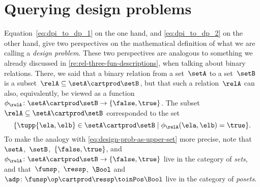 
\section{Querying design problems}
\label{sec:dp-querying}



Equation~\cref{eq:dpi_to_dp_1} on the one hand, and \cref{eq:dpi_to_dp_2} on the other hand, give two perspectives on the mathematical definition of what we are calling a \emph{design problem}.
These two perspectives are analogous to something we already discussed in \cref{re:rel-three-fun-descriptions}, when talking about binary relations.
There, we said that a binary relation from a set~$\setA$ to a set~$\setB$ is a subset~$\relA \subseteq \setA \cartprod \setB$,
but that such a relation~$\relA$ can also, equivalently, be viewed as a function~$\phi_{\relA}\colon \setA \cartprod\setB \to \{ \false, \true \}$.
The subset~$\relA \subseteq \setA \cartprod \setB$ corresponded to the set
\begin{equation}
	\{ \tupp{\ela, \elb} \in \setA \cartprod \setB \mid \phi_{\relA}(\ela, \elb) = \true \}.
\end{equation}
%
To make the analogy with \cref{eq:design-prob-as-upper-set} more precise, note that~$\setA$,~$\setB$,~$\{ \false, \true \}$, and~$\phi_{\relA}\colon \setA \cartprod\setB \to \{ \false, \true \}$ live in the category of \emph{sets}, and that~$\funsp$,~$\ressp$,~$\Bool$ and~$\adp\colon \funsp\op \cartprod \ressp\toinPos \Bool$ live in the category of \emph{posets}.

